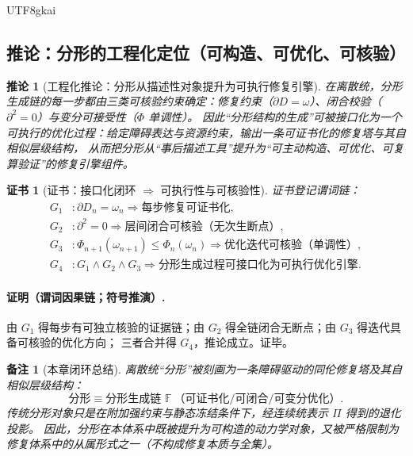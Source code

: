 \documentclass[12pt]{article}
\newtheorem{corollary}{推论}[section]
\newtheorem{remark}{备注}[section]
\newtheorem{Certificate}{证书}[section]
\newcommand{\KouJing}{\texorpdfstring{表述约定}{表述约定}}
\begin{document}
\begin{CJK*}{UTF8}{gkai}
\subsection{推论：分形的工程化定位（可构造、可优化、可核验）}
\label{subsec:tex29-fractal-engineering}

\begin{corollary}[工程化推论：分形从描述性对象提升为可执行修复引擎]
\label{cor:tex29-fractal-engineering}
在离散统，分形生成链的每一步都由三类可核验约束确定：修复约束（$\partial D=\omega$）、闭合校验（$\partial^2=0$）与变分可接受性（$\Phi$ 单调性）。
因此“分形结构的生成”可被接口化为一个可执行的优化过程：给定障碍表达与资源约束，输出一条可证书化的修复塔与其自相似层级结构，
从而把分形从“事后描述工具”提升为“可主动构造、可优化、可复算验证”的修复引擎组件。
\end{corollary}

\begin{Certificate}[证书：接口化闭环 $\Rightarrow$ 可执行性与可核验性]
\label{cert:tex29-fractal-engineering}
证书登记谓词链：
\[
\begin{aligned}
  G_1 &: \partial D_n=\omega_n\Rightarrow \text{每步修复可证书化},\\
  G_2 &: \partial^2=0\Rightarrow \text{层间闭合可核验（无次生断点）},\\
  G_3 &: \Phi_{n+1}(\omega_{n+1})\le \Phi_n(\omega_n)\Rightarrow \text{优化迭代可核验（单调性）},\\
  G_4 &: G_1\wedge G_2\wedge G_3\Rightarrow \text{分形生成过程可接口化为可执行优化引擎}.
\end{aligned}
\]
\end{Certificate}

\paragraph{证明（谓词因果链；符号推演）.}
由 $G_1$ 得每步有可独立核验的证据链；由 $G_2$ 得全链闭合无断点；由 $G_3$ 得迭代具备可核验的优化方向；
三者合并得 $G_4$，推论成立。证毕。

\begin{remark}[本章闭环总结]
离散统“分形”被刻画为一条障碍驱动的同伦修复塔及其自相似层级结构：
\[
  \text{分形} \equiv \text{分形生成链 } \mathbb{F}\ \text{（可证书化/可闭合/可变分优化）}.
\]
传统分形对象只是在附加强约束与静态冻结条件下，经连续统表示 $\Pi$ 得到的退化投影。
因此，分形在本体系中既被提升为可构造的动力学对象，又被严格限制为修复体系中的从属形式之一（不构成修复本质与全集）。
\end{remark}


\end{CJK*}
\end{document}
